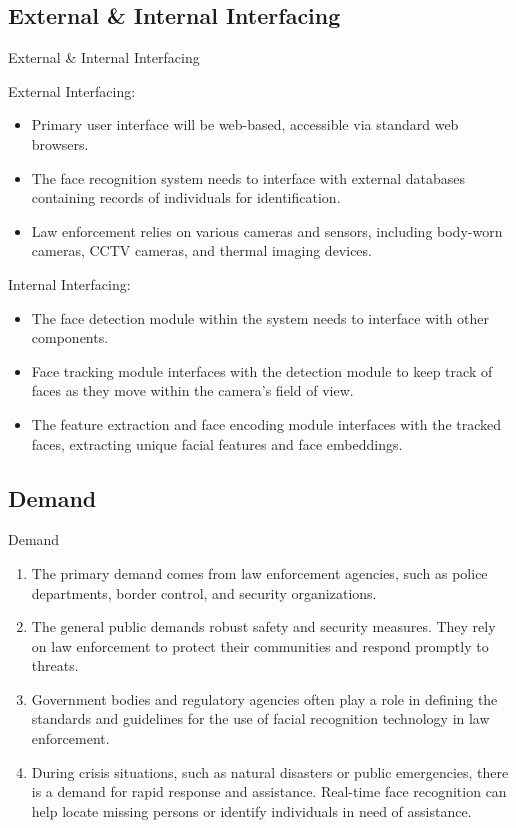 \subsection{External \& Internal Interfacing}
\begin{frame}{External \& Internal Interfacing}
	\begin{multicols}{2}
		External Interfacing:
		\begin{itemize}
			\item Primary user interface will be web-based, accessible via standard web browsers.
			\item The face recognition system needs to interface with external databases containing records of individuals for identification. 
			\item Law enforcement relies on various cameras and sensors, including body-worn cameras, CCTV cameras, and thermal imaging devices.
		\end{itemize}

		\break

		Internal Interfacing:
		\begin{itemize}
			\item The face detection module within the system needs to interface with other components. 
			\item Face tracking module interfaces with the detection module to keep track of faces as they move within the camera's field of view.
			\item The feature extraction and face encoding module interfaces with the tracked faces, extracting unique facial features and face embeddings.
		\end{itemize}
	\end{multicols}
\end{frame}

\subsection{Demand}
\begin{frame}{Demand}
	\begin{enumerate}
		\item The primary demand comes from law enforcement agencies, such as police departments, border control, and security organizations.
		\item The general public demands robust safety and security measures. They rely on law enforcement to protect their communities and respond promptly to threats.
		\item Government bodies and regulatory agencies often play a role in defining the standards and guidelines for the use of facial recognition technology in law enforcement.
		\item During crisis situations, such as natural disasters or public emergencies, there is a demand for rapid response and assistance. Real-time face recognition can help locate missing persons or identify individuals in need of assistance.
	\end{enumerate}
\end{frame}

